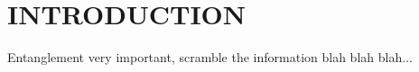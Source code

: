 \section{INTRODUCTION}

Entanglement very important, scramble the information blah blah blah...\cite{ShenkerBlackHolesButterfly2014}
